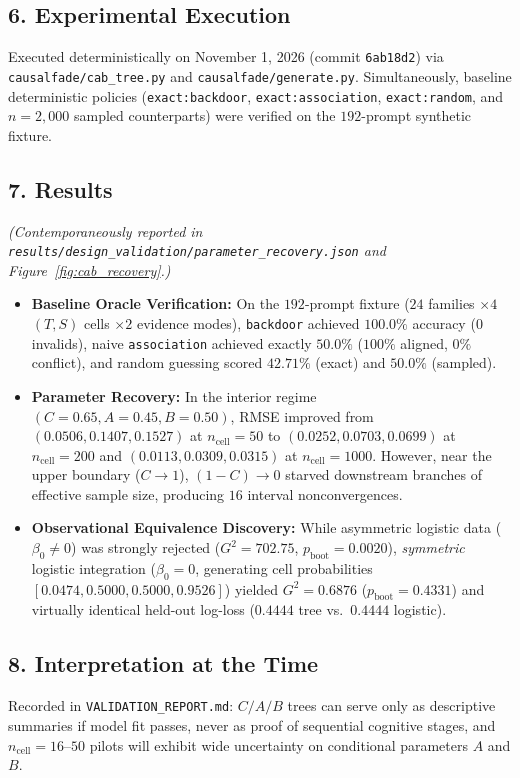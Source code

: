 \subsection*{6. Experimental Execution}
Executed deterministically on November 1, 2026 (commit \texttt{6ab18d2}) via \texttt{causalfade/cab\_tree.py} and \texttt{causalfade/generate.py}. Simultaneously, baseline deterministic policies (\texttt{exact:backdoor}, \texttt{exact:association}, \texttt{exact:random}, and $n=2{,}000$ sampled counterparts) were verified on the $192$-prompt synthetic fixture.

\subsection*{7. Results}
\emph{(Contemporaneously reported in \texttt{results/design\_validation/parameter\_recovery.json} and Figure~\ref{fig:cab_recovery}.)}
\begin{itemize}
  \item \textbf{Baseline Oracle Verification:} On the $192$-prompt fixture ($24$ families $\times 4$ $(T,S)$ cells $\times 2$ evidence modes), \texttt{backdoor} achieved $100.0\%$ accuracy ($0$ invalids), naive \texttt{association} achieved exactly $50.0\%$ ($100\%$ aligned, $0\%$ conflict), and random guessing scored $42.71\%$ (exact) and $50.0\%$ (sampled).
  \item \textbf{Parameter Recovery:} In the interior regime $(C=0.65, A=0.45, B=0.50)$, RMSE improved from $(0.0506, 0.1407, 0.1527)$ at $n_{\mathrm{cell}}=50$ to $(0.0252, 0.0703, 0.0699)$ at $n_{\mathrm{cell}}=200$ and $(0.0113, 0.0309, 0.0315)$ at $n_{\mathrm{cell}}=1000$. However, near the upper boundary ($C \to 1$), $(1-C) \to 0$ starved downstream branches of effective sample size, producing $16$ interval nonconvergences.
  \item \textbf{Observational Equivalence Discovery:} While asymmetric logistic data ($\beta_0 \neq 0$) was strongly rejected ($G^2 = 702.75$, $p_{\text{boot}} = 0.0020$), \emph{symmetric} logistic integration ($\beta_0 = 0$, generating cell probabilities $[0.0474, 0.5000, 0.5000, 0.9526]$) yielded $G^2 = 0.6876$ ($p_{\text{boot}} = 0.4331$) and virtually identical held-out log-loss ($0.4444$ tree vs.\ $0.4444$ logistic).
\end{itemize}

\subsection*{8. Interpretation at the Time}
Recorded in \texttt{VALIDATION\_REPORT.md}: $C/A/B$ trees can serve only as descriptive summaries if model fit passes, never as proof of sequential cognitive stages, and $n_{\mathrm{cell}}=16$--$50$ pilots will exhibit wide uncertainty on conditional parameters $A$ and $B$.

